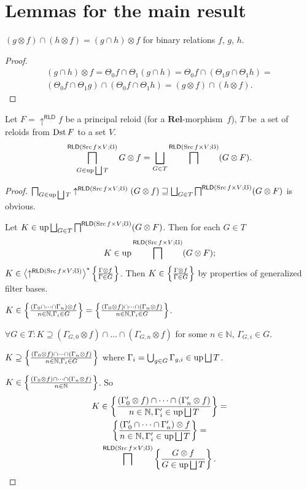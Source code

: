 \section{Lemmas for the main result}
\begin{lem}
$(g\otimes f)\cap(h\otimes f)=(g\cap h)\otimes f$ for binary relations
$f$, $g$, $h$.\end{lem}
\begin{proof}
~
\begin{multline*}
(g\cap h)\otimes f=\Theta_{0}f\cap\Theta_{1}(g\cap h)=\Theta_{0}f\cap(\Theta_{1}g\cap\Theta_{1}h)=\\
(\Theta_{0}f\cap\Theta_{1}g)\cap(\Theta_{0}f\cap\Theta_{1}h)=(g\otimes f)\cap(h\otimes f).
\end{multline*}
\end{proof}
\begin{lem}
Let $F=\uparrow^{\mathsf{RLD}}f$ be a principal reloid (for a $\mathbf{Rel}$-morphism~$f$),
$T$ be~a set of reloids from $\operatorname{Dst} F$ to a set $V$.
\[
\bigsqcap_{G\in\operatorname{up}\bigsqcup T}^{\mathsf{RLD}(\operatorname{Src} f\times V;\mho)}G\otimes f=\bigsqcup_{G\in T}\bigsqcap^{\mathsf{RLD}(\operatorname{Src} f\times V;\mho)}(G\otimes F).
\]
\end{lem}
\begin{proof}
$\bigsqcap_{G\in\operatorname{up}\bigsqcup T}\uparrow^{\mathsf{RLD}(\operatorname{Src} f\times V;\mho)}(G\otimes f)\sqsupseteq\bigsqcup_{G\in T}\bigsqcap^{\mathsf{RLD}(\operatorname{Src} f\times V;\mho)}(G\otimes F)$
is obvious.

Let $K\in\operatorname{up}\bigsqcup_{G\in T}\bigsqcap^{\mathsf{RLD}(\operatorname{Src} f\times V;\mho)}(G\otimes F)$.
Then for each $G\in T$
\[
K\in\operatorname{up}\bigsqcap^{\mathsf{RLD}(\operatorname{Src} f\times V;\mho)}(G\otimes F);
\]
$K\in\left\langle \uparrow^{\mathsf{RLD}(\operatorname{Src} f\times V;\mho)}\right\rangle ^{\ast}\left\{ \frac{\Gamma\otimes f}{\Gamma\in G}\right\}$.
Then $K\in\left\{ \frac{\Gamma\otimes f}{\Gamma\in G}\right\}$ by properties of
generalized filter bases.

$K\in\left\{ \frac{(\Gamma_{0}\cap\dots\cap\Gamma_{n})\otimes f}{n\in\mathbb{N},\Gamma_{i}\in G}\right\}=\left\{ \frac{(\Gamma_{0}\otimes f)\cap\dots\cap(\Gamma_{n}\otimes f)}{n\in\mathbb{N},\Gamma_{i}\in G}\right\}$.

$\forall G\in T:K\supseteq(\Gamma_{G,0}\otimes f)\cap\dots\cap(\Gamma_{G,n}\otimes f)$
for some $n\in\mathbb{N}$, $\Gamma_{G,i}\in G$.

$K\supseteq\left\{ \frac{(\Gamma_{0}\otimes f)\cap\dots\cap(\Gamma_{n}\otimes f)}{n\in\mathbb{N},\Gamma_{i}\in G}\right\}$
where $\Gamma_{i}=\bigcup_{g\in G}\Gamma_{g,i}\in\operatorname{up}\bigsqcup T$.

$K\in\left\{ \frac{(\Gamma_{0}\otimes f)\cap\dots\cap(\Gamma_{n}\otimes f)}{n\in\mathbb{N}}\right\}$.
So
\begin{multline*}
K\in\left\{ \frac{(\Gamma'_{0}\otimes f)\cap\dots\cap(\Gamma'_{n}\otimes f)}{n\in\mathbb{N},\Gamma'_{i}\in\operatorname{up}\bigsqcup T}\right\}=\\
\left\{ \frac{(\Gamma'_{0}\cap\dots\cap\Gamma'_{n})\otimes f}{n\in\mathbb{N},\Gamma'_{i}\in\operatorname{up}\bigsqcup T}\right\}=\\
\bigsqcap^{\mathsf{RLD}(\operatorname{Src} f\times V;\mho)}\left\{ \frac{G\otimes f}{G\in\operatorname{up}\bigsqcup T}\right\}.
\end{multline*}

\end{proof}

